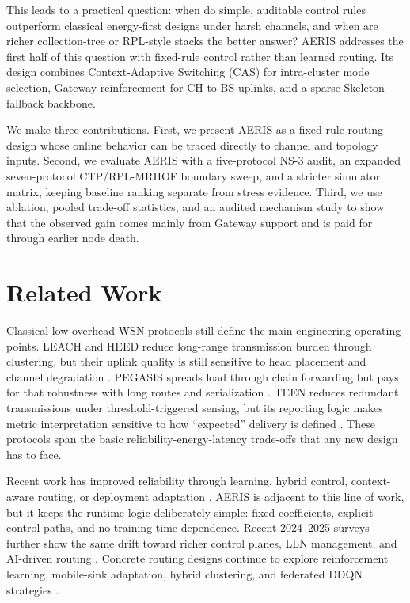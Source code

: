 \documentclass[conference]{IEEEtran}
\begin{document}
This leads to a practical question: when do simple, auditable control rules outperform classical energy-first designs under harsh channels, and when are richer collection-tree or RPL-style stacks the better answer? AERIS addresses the first half of this question with fixed-rule control rather than learned routing. Its design combines Context-Adaptive Switching (CAS) for intra-cluster mode selection, Gateway reinforcement for CH-to-BS uplinks, and a sparse Skeleton fallback backbone.

We make three contributions. First, we present AERIS as a fixed-rule routing design whose online behavior can be traced directly to channel and topology inputs. Second, we evaluate AERIS with a five-protocol NS-3 audit, an expanded seven-protocol CTP/RPL-MRHOF boundary sweep, and a stricter simulator matrix, keeping baseline ranking separate from stress evidence. Third, we use ablation, pooled trade-off statistics, and an audited mechanism study to show that the observed gain comes mainly from Gateway support and is paid for through earlier node death.

\section{Related Work}
Classical low-overhead WSN protocols still define the main engineering operating points. LEACH and HEED reduce long-range transmission burden through clustering, but their uplink quality is still sensitive to head placement and channel degradation \cite{Heinzelman2002LEACH,Younis2004HEED}. PEGASIS spreads load through chain forwarding but pays for that robustness with long routes and serialization \cite{Lindsey2002PEGASIS}. TEEN reduces redundant transmissions under threshold-triggered sensing, but its reporting logic makes metric interpretation sensitive to how ``expected'' delivery is defined \cite{Manjeshwar2001TEEN}. These protocols span the basic reliability-energy-latency trade-offs that any new design has to face.

Recent work has improved reliability through learning, hybrid control, context-aware routing, or deployment adaptation \cite{Chen2019Survey,Naeem2024DRL,Scientific2025DRLGNN,Tossa2025Deployment,Wang2024Geographic,Khedr2025ContextAware,Almutairi2025SSIPaS}. AERIS is adjacent to this line of work, but it keeps the runtime logic deliberately simple: fixed coefficients, explicit control paths, and no training-time dependence. Recent 2024--2025 surveys further show the same drift toward richer control planes, LLN management, and AI-driven routing \cite{Almutairi2024LLNSurvey,Djennadi2025SDNLLN,Thakur2025AIReview}. Concrete routing designs continue to explore reinforcement learning, mobile-sink adaptation, hybrid clustering, and federated DDQN strategies \cite{Ren2024,Okine2024,Singh2025Enhanced,Bhukya2025Hybrid}.
\end{document}
